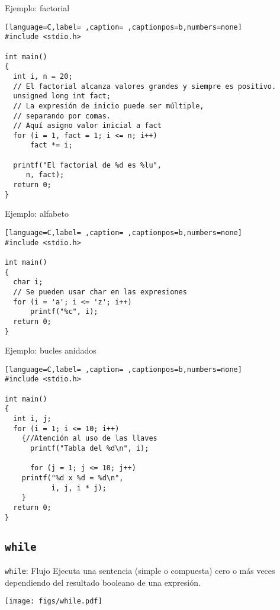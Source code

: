 \documentclass[usenames,svgnames,dvipsnames, aspectratio=169]{beamer}
\begin{document}
\begin{frame}[label={sec:orgd1ae7b5},fragile]{Ejemplo: factorial}
 \begin{lstlisting}[language=C,label= ,caption= ,captionpos=b,numbers=none]
#include <stdio.h>

int main()
{
  int i, n = 20;
  // El factorial alcanza valores grandes y siempre es positivo.
  unsigned long int fact;
  // La expresión de inicio puede ser múltiple,
  // separando por comas.
  // Aquí asigno valor inicial a fact
  for (i = 1, fact = 1; i <= n; i++)
      fact *= i;

  printf("El factorial de %d es %lu", 
	 n, fact);
  return 0;
}
\end{lstlisting}
\end{frame}


\begin{frame}[label={sec:orgbc17d9e},fragile]{Ejemplo: alfabeto}
 \begin{lstlisting}[language=C,label= ,caption= ,captionpos=b,numbers=none]
#include <stdio.h>

int main()
{
  char i;
  // Se pueden usar char en las expresiones 
  for (i = 'a'; i <= 'z'; i++)
      printf("%c", i);
  return 0;
}
\end{lstlisting}
\end{frame}


\begin{frame}[label={sec:orgeee50d8},fragile]{Ejemplo: bucles anidados}
 \begin{lstlisting}[language=C,label= ,caption= ,captionpos=b,numbers=none]
#include <stdio.h>

int main()
{
  int i, j;
  for (i = 1; i <= 10; i++)
    {//Atención al uso de las llaves
      printf("Tabla del %d\n", i);

      for (j = 1; j <= 10; j++)
	printf("%d x %d = %d\n",
	       i, j, i * j);
    }
  return 0;
}
\end{lstlisting}
\end{frame}

\subsection{\texttt{while}}
\label{sec:orgec69567}

\begin{frame}[label={sec:org52cf7fd},fragile]{\texttt{while}: Flujo}
 Ejecuta una sentencia (simple o compuesta) \alert{cero o más veces} dependiendo del resultado booleano de una expresión.

\begin{center}
\texttt{[image: figs/while.pdf]}
\end{center}
\end{frame}
\end{document}
